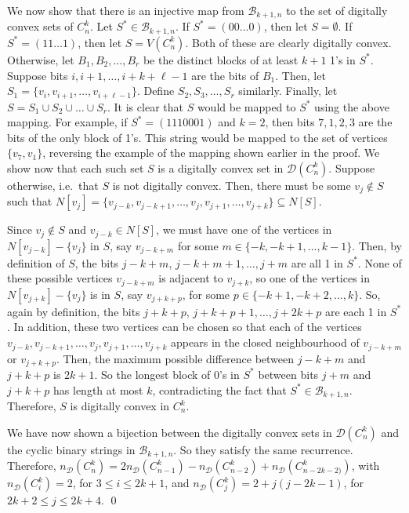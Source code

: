 \documentclass[12pt]{article}
\begin{document}
We now show that there is an injective map from $\mathscr{B}_{k+1,n}$ to the set of digitally convex sets of $C^k_n$. Let $S^*\in\mathscr{B}_{k+1,n}$. 
If $S^* = (00\dots0)$, then let $S=\emptyset$. If $S^* = (11\dots1)$, then let $S=V(C^k_n)$. Both of these are clearly digitally convex. Otherwise, let $B_1,B_2,\dots,B_r$ be the distinct blocks of at least $k+1$ 1's in $S^*$. Suppose bits $i, i+1, \dots, i+k+\ell-1$ are the bits of $B_1$. Then, let $S_1 = \{v_i, v_{i+1}, \dots, v_{i+\ell-1}\}$. Define $S_2,S_3,\dots,S_r$ similarly. Finally, let $S=S_1\cup S_2\cup\dots\cup S_r$. It is clear that $S$ would be mapped to $S^*$ using the above mapping. For example, if $S^* = (1110001)$ and $k=2$, then bits $7, 1, 2, 3$ are the bits of the only block of 1's. This string would be mapped to the set of vertices $\{v_7, v_1\}$, reversing the example of the mapping shown earlier in the proof. 
We show now that each such set $S$ is a digitally convex set in $\mathscr{D}(C^k_n)$. Suppose otherwise, i.e.~that $S$ is not digitally convex. Then, there must be some $v_j\not\in S$ such that $N[v_j] = \{v_{j-k}, v_{j-k+1}, \dots, v_j, v_{j+1}, \dots, v_{j+k}\} \subseteq N[S]$. 

Since $v_j\not\in S$ and $v_{j-k}\in N[S]$, we must have one of the vertices in $N[v_{j-k}]-\{v_j\}$ in $S$, say $v_{j-k+m}$ for some $m\in\{-k,-k+1,\dots,k-1\}$. Then, by definition of $S$, the bits $j-k+m$, $j-k+m+1,\dots, j+m$ are all 1 in $S^*$. None of these possible vertices $v_{j-k+m}$ is adjacent to $v_{j+k}$, so one of the vertices in $N[v_{j+k}]-\{v_j\}$ is in $S$, say $v_{j+k+p}$, for some $p\in\{-k+1, -k+2,\dots,k\}$. So, again by definition, the bits $j+k+p$, $j+k+p+1, \dots, j+2k+p$ are each 1 in $S^*$. In addition, these two vertices can be chosen so that each of the vertices $v_{j-k}, v_{j-k+1}, \dots, v_j, v_{j+1}, \dots, v_{j+k}$ appears in the closed neighbourhood of $v_{j-k+m}$ or $v_{j+k+p}$. Then, the maximum possible difference between $j-k+m$ and $j+k+p$ is $2k+1$. So the longest block of 0's in $S^*$ between bits $j+m$ and $j+k+p$ has length at most $k$, contradicting the fact that $S^*\in \mathscr{B}_{k+1,n}$. Therefore, $S$ is digitally convex in $C^k_n$. 

We have now shown a bijection between the digitally convex sets in $\mathscr{D}(C^k_n)$ and the cyclic binary strings in $\mathscr{B}_{k+1,n}$. So they satisfy the same recurrence. Therefore, $n_\mathscr{D}(C^k_n) = 2n_\mathscr{D}(C^k_{n-1})-n_\mathscr{D}(C^k_{n-2}) + n_\mathscr{D}(C^k_{n-2k-2)})$, with $n_\mathscr{D}(C^k_i) = 2$, for $3\leq i \leq 2k+1$, and $n_\mathscr{D}(C^k_j) = 2+j(j-2k-1)$, for $2k+2 \leq j \leq 2k+4$. \qed
\end{document}

